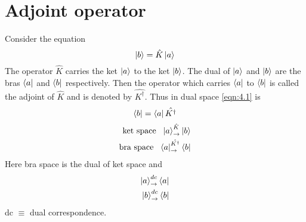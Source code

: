 
\ifpdf
\graphicspath{{Chapter4/figs/}}
\else
\graphicspath{{Chapter4/figs/}}
\fi



\section{Adjoint operator}
Consider the equation
\begin{equation}\label{eqn:4.1}
\ket{b} = \hat{K} \ket{a}
\end{equation}
The operator $\hat{K}$ carries the ket $\ket{a}$ to the ket $\ket{b}$. The dual of $\ket{a}$ and $\ket{b}$ are the bras $\bra{a}$ and $\bra{b}$ respectively. Then the operator which carries $\bra{a}$ to $\bra{b}$ is called the adjoint of $\hat{K}$ and is denoted by $\hat{K^\dagger}$. Thus in dual space \ref{eqn:4.1} is
\begin{equation}\label{eqn:4.2}
\bra{b} = \bra{a} \hat{K^\dagger}
\end{equation}
\begin{align}\label{eqn:4.3-4.4}
	\text{ket space \ } \ket{a} _\rightarrow^{\hat{K}} \ket{b}\\
	\text{bra space \ } \bra{a} _\rightarrow^{\hat{K^\dagger}} \bra{b}
\end{align}
Here bra space is the dual of ket space and
\begin{align}\label{eqn:4.5-4.6}
	\ket{a} _\rightarrow^{dc} \bra{a} \\
	\ket{b} _\rightarrow^{dc} \bra{b}
\end{align}
dc $\equiv$ dual correspondence.\\

